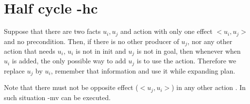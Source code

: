 
	
	\chapter{Half cycle -hc}
	Suppose that there are two facts $u_i, u_j$ and action with only one effect $<u_i,u_j>$ and no precondition. Then, if there is no other producer of $u_j$, nor any other action that needs $u_i$, $u_i$ is not in init and $u_j$ is not in goal, then whenever when $u_i$ is added, the only possible way to add $u_j$ is to use the action. Therefore we replace $u_j$ by $u_i$, remember that information and use it while expanding plan.
	
	Note that there must not be opposite effect ($<u_j,u_i>$) in any other action . In such situation -mv can be executed.

